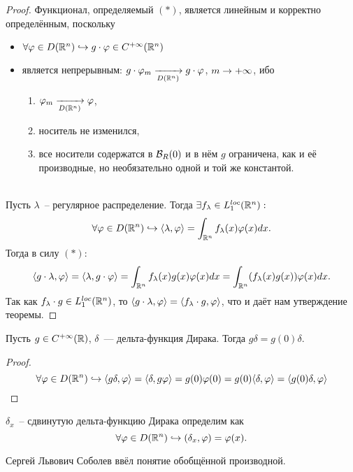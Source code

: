 \begin{proof} Функционал, определяемый $(\ast)$, является линейным и корректно определённым, поскольку
    \begin{itemize}
        \item $\forall \varphi \in D(\mathbb{R}^n) \hookrightarrow g \cdot \varphi \in C^{+\infty}(\mathbb{R}^n)$
        \item является непрерывным: $g \cdot\varphi_m \xrightarrow[D(\mathbb{R}^n)]{} g \cdot \varphi$, $m \rightarrow +\infty$, ибо  
        \begin{enumerate}
            \item $\varphi_m \xrightarrow[D(\mathbb{R}^n)]{} \varphi$,
            \item носитель не изменился,
            \item все носители содержатся в $\mathcal{B}_R(0)$ и в нём $g$ ограничена, как и её производные, но необязательно одной и той же константой.
        \end{enumerate}
    \end{itemize}\\
    Пусть $\lambda$~-- регулярное распределение.
    Тогда $\exists f_\lambda \in L_1^{loc}(\mathbb{R}^n):$ 
    \[
        \forall \varphi \in D(\mathbb{R}^n) \hookrightarrow \langle \lambda, \varphi \rangle = \int_{\mathbb{R}^n} f_{\lambda}(x) \varphi(x) dx.
    \]
    Тогда в силу $(\ast)$:
    \[
        \langle g \cdot \lambda, \varphi \rangle = \langle\lambda, g \cdot \varphi \rangle = \int_{\mathbb{R}^n} f_{\lambda}(x) g(x) \varphi(x) dx = \int_{\mathbb{R}^n} (f_\lambda(x) g(x))\varphi(x)dx.
    \]
    Так как $f_\lambda \cdot g \in L_1^{loc}(\mathbb{R}^n)$, то $\langle g \cdot \lambda, \varphi \rangle  = \langle f_\lambda \cdot g, \varphi \rangle $, что и даёт нам утверждение теоремы.
\end{proof}
\begin{example}
    Пусть $g \in C^{+\infty}(\mathbb{R})$, $\delta$~--- дельта-функция Дирака. Тогда $g\delta = g(0)\delta$.
    \begin{proof}
        \[ \forall \varphi \in D(\mathbb{R}^n) \hookrightarrow
        \langle g \delta, \varphi \rangle  = \langle \delta, g \varphi \rangle = g(0)\varphi(0) = g(0) \langle \delta, \varphi \rangle = \langle g(0)\delta, \varphi \rangle 
        \]
    \end{proof} 
\end{example}
\begin{definition}
    $\delta_x$~-- сдвинутую дельта-функцию Дирака определим как
    \[
        \forall \varphi \in D(\mathbb{R}^n) \hookrightarrow (\delta_x, \varphi) = \varphi(x).
    \]
\end{definition}
\begin{remark}
     Сергей Львович Соболев ввёл понятие обобщённой производной.
\end{remark}
